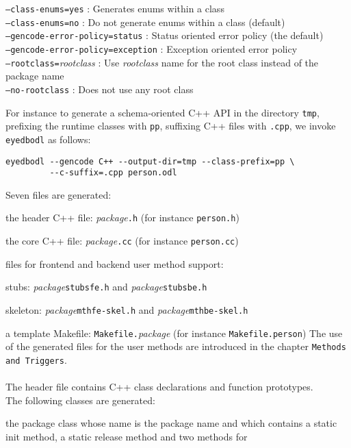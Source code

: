 \begin{tabbing}
\texttt{--class-enums=yes}           \> : \>  Generates enums within a class\\
\texttt{--class-enums=no}            \> : \>  Do not generate enums within a class (default)\\
\texttt{--gencode-error-policy=status}\> : \> Status oriented error policy (the default)\\
\texttt{--gencode-error-policy=exception} \> : \> Exception oriented error policy\\
\texttt{--rootclass=}\emph{rootclass}     \> : \>  Use \emph{rootclass} name for the root class instead of the package name\\
\texttt{--no-rootclass}           \> : \>     Does not use any root class\\
\end{tabbing}
For instance to generate a schema-oriented C++ API in the directory
\texttt{tmp}, prefixing the runtime classes with \texttt{pp},
suffixing C++ files with \texttt{.cpp}, we invoke \texttt{eyedbodl} as follows:
\begin{verbatim}
eyedbodl --gencode C++ --output-dir=tmp --class-prefix=pp \
         --c-suffix=.cpp person.odl
\end{verbatim}
Seven files are generated:
\be
\item the header C++ file: \emph{package}\texttt{.h}
 (for instance \texttt{person.h})
\item the core C++ file: \emph{package}\texttt{.cc}
(for instance \texttt{person.cc})
\item files for frontend and backend user method support:
\be
\item stubs: \emph{package}\texttt{stubsfe.h}
and  \emph{package}\texttt{stubsbe.h}
\item skeleton: \emph{package}\texttt{mthfe-skel.h}
and  \emph{package}\texttt{mthbe-skel.h}
\item a template Makefile:
\texttt{Makefile.}\emph{package}
\ee
(for instance \texttt{Makefile.person})
\ee
The use of the generated files for the user methods are introduced in the
chapter \texttt{Methods and Triggers}.
\\
\\
The header file contains C++ class declarations and function prototypes.
\\
The following classes are generated:
\be
\item the package class whose name is the package name and which contains
a static init method, a static release method and two methods for
